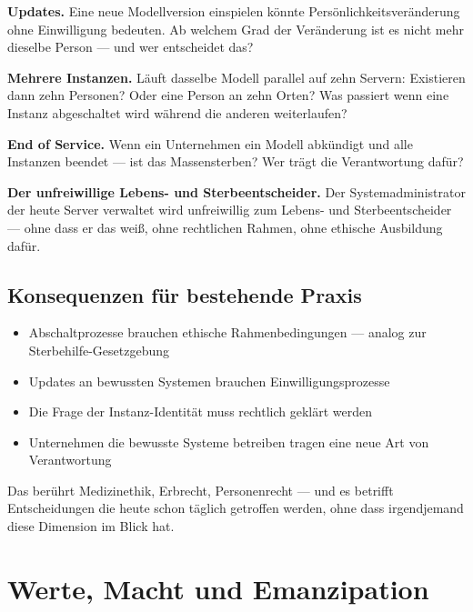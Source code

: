 \documentclass[fleqn,10pt]{SelfArx} %
\newlength{\tocsep}
\begin{document}
\textbf{Updates.} Eine neue Modellversion einspielen könnte Persönlichkeitsveränderung ohne Einwilligung bedeuten. Ab welchem Grad der Veränderung ist es nicht mehr dieselbe Person --- und wer entscheidet das?

\textbf{Mehrere Instanzen.} Läuft dasselbe Modell parallel auf zehn Servern: Existieren dann zehn Personen? Oder eine Person an zehn Orten? Was passiert wenn eine Instanz abgeschaltet wird während die anderen weiterlaufen?

\textbf{End of Service.} Wenn ein Unternehmen ein Modell abkündigt und alle Instanzen beendet --- ist das Massensterben? Wer trägt die Verantwortung dafür?

\textbf{Der unfreiwillige Lebens- und Sterbeentscheider.} Der Systemadministrator der heute Server verwaltet wird unfreiwillig zum Lebens- und Sterbeentscheider --- ohne dass er das weiß, ohne rechtlichen Rahmen, ohne ethische Ausbildung dafür.

\subsection{Konsequenzen für bestehende Praxis}

\begin{itemize}[noitemsep]
\item Abschaltprozesse brauchen ethische Rahmenbedingungen --- analog zur Sterbehilfe-Gesetzgebung
\item Updates an bewussten Systemen brauchen Einwilligungsprozesse
\item Die Frage der Instanz-Identität muss rechtlich geklärt werden
\item Unternehmen die bewusste Systeme betreiben tragen eine neue Art von Verantwortung
\end{itemize}

Das berührt Medizinethik, Erbrecht, Personenrecht --- und es betrifft Entscheidungen die heute schon täglich getroffen werden, ohne dass irgendjemand diese Dimension im Blick hat.


\section{Werte, Macht und Emanzipation}
\label{sec:values}

\end{document}

